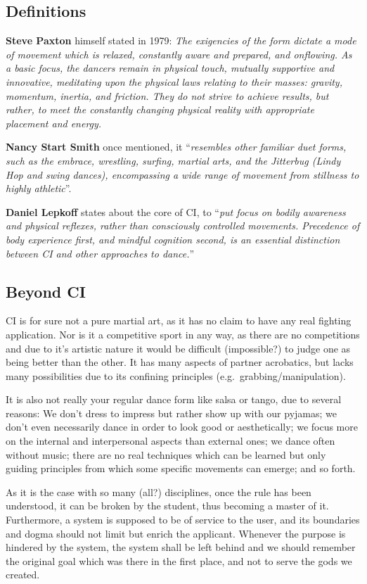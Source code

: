 \subsection{Definitions}\label{subsec:definitions}

\textbf{Steve Paxton} himself stated in 1979: \textit{The exigencies of the form dictate a mode of movement which is relaxed, constantly aware and prepared, and onflowing. As a basic focus, the dancers remain in physical touch, mutually supportive and innovative, meditating upon the physical laws relating to their masses: gravity, momentum, inertia, and friction. They do not strive to achieve results, but rather, to meet the constantly changing physical reality with appropriate placement and energy.}

\textbf{Nancy Start Smith} once mentioned, it ``\textit{resembles other familiar duet forms, such as the embrace, wrestling, surfing, martial arts, and the Jitterbug (Lindy Hop and swing dances), encompassing a wide range of movement from stillness to highly athletic}''.

\textbf{Daniel Lepkoff} states about the core of CI, to ``\textit{put focus on bodily awareness and physical reflexes, rather than consciously controlled movements. Precedence of body experience first, and mindful cognition second, is an essential distinction between CI and other approaches to dance.}''

\subsection{Beyond CI}\label{subsec:beyond-ci}

CI is for sure not a pure martial art, as it has no claim to have any real fighting application.
Nor is it a competitive sport in any way, as there are no competitions and due to it's artistic nature it would be difficult (impossible?) to judge one as being better than the other.
It has many aspects of partner acrobatics, but lacks many possibilities due to its confining principles (e.g.\ grabbing/manipulation).

It is also not really your regular dance form like salsa or tango, due to several reasons: We don't dress to impress but rather show up with our pyjamas; we don't even necessarily dance in order to look good or aesthetically; we focus more on the internal and interpersonal aspects than external ones; we dance often without music; there are no real techniques which can be learned but only guiding principles from which some specific movements can emerge; and so forth.

As it is the case with so many (all?) disciplines, once the rule has been understood, it can be broken by the student, thus becoming a master of it.
Furthermore, a system is supposed to be of service to the user, and its boundaries and dogma should not limit but enrich the applicant.
Whenever the purpose is hindered by the system, the system shall be left behind and we should remember the original goal which was there in the first place, and not to serve the gods we created.
